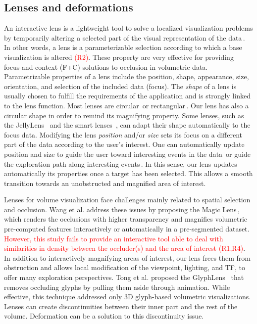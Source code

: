 \vspace{-0.15cm}
\subsection{Lenses and deformations}
%
An interactive lens is a lightweight tool to solve a localized visualization problems by temporarily altering a selected part of the visual representation of the data\,\cite{CGF:CGF12871}. In other words, a lens is a parameterizable selection according to which a base visualization is altered \textcolor{red}{(R2)}. These property are very effective for providing focus-and-context (F+C) solutions to occlusion in volumetric data. Parametrizable properties of a lens include the position, shape, appearance, size, orientation, and selection of the included data (focus). The \emph{shape} of a lens is usually chosen to fulfill the requirements of the application and is strongly linked to the lens function. Most lenses are circular\,\cite{1648236} or rectangular\,\cite{Kincaid:2010:SFA:1907651.1907963}. Our lens has also a circular shape in order to remind its magnifying property. Some lenses, such as the JellyLens~\cite{Pindat:2012:JCA:2380116.2380150} and the smart lenses~\cite{Thiede2008}, can adapt their shape automatically to the focus data. Modifying the lens \emph{position} and/or \emph{size} sets its focus on a different part of the data according to the user's interest. One can automatically update position and size to guide the user toward interesting events in the data\,\cite{Tominski:2011:ECU:2336207.2336211} or guide the exploration path along interesting events\,\cite{Alvina:2014:RER:2598153.2598200}. In this sense, our lens updates automatically its properties once a target has been selected. This allows a smooth transition towards an unobstructed and magnified area of interest.

Lenses for volume visualization face challenges mainly related to spatial selection and occlusion. Wang et al. address these issues by proposing the Magic Lens\,\cite{1532818}, which renders the occlusions with higher transparency and magnifies volumetric pre-computed features interactively or automatically in a pre-segmented dataset. \textcolor{red}{However, this study fails to provide an interactive tool able to deal with similarities in density between the occluder(s) and the area of interest (R1,R4)}. In addition to interactively magnifying areas of interest, our lens frees them from obstruction and allows local modification of the viewpoint, lighting, and TF, to offer many exploration perspectives. Tong et al. proposed the GlyphLens~\cite{7539643} that removes occluding glyphs by pulling them aside through animation. While effective, this technique addressed only 3D glyph-based volumetric visualizations. Lenses can create discontinuities between their inner part and the rest of the volume. Deformation can be a solution to this discontinuity issue.

